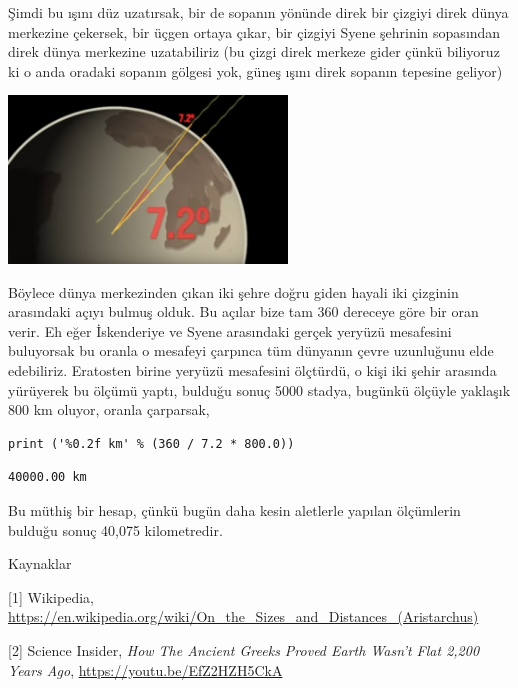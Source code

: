 \documentclass[12pt,fleqn]{article}\usepackage{../../common}
\begin{document}
Şimdi bu ışını düz uzatırsak, bir de sopanın yönünde direk bir çizgiyi direk
dünya merkezine çekersek, bir üçgen ortaya çıkar, bir çizgiyi Syene şehrinin
sopasından direk dünya merkezine uzatabiliriz (bu çizgi direk merkeze gider
çünkü biliyoruz ki o anda oradaki sopanın gölgesi yok, güneş ışını direk sopanın
tepesine geliyor)

\includegraphics[width=20em]{circum2.jpg}

Böylece dünya merkezinden çıkan iki şehre doğru giden hayali iki çizginin
arasındaki açıyı bulmuş olduk. Bu açılar bize tam 360 dereceye göre bir oran
verir. Eh eğer İskenderiye ve Syene arasındaki gerçek yeryüzü mesafesini
buluyorsak bu oranla o mesafeyi çarpınca tüm dünyanın çevre uzunluğunu elde
edebiliriz. Eratosten birine yeryüzü mesafesini ölçtürdü, o kişi iki şehir
arasında yürüyerek bu ölçümü yaptı, bulduğu sonuç 5000 stadya, bugünkü
ölçüyle yaklaşık 800 km oluyor, oranla çarparsak,

\begin{verbatim}
print ('%0.2f km' % (360 / 7.2 * 800.0))
\end{verbatim}

\begin{verbatim}
40000.00 km
\end{verbatim}

Bu müthiş bir hesap, çünkü bugün daha kesin aletlerle yapılan ölçümlerin bulduğu
sonuç 40,075 kilometredir.

Kaynaklar

[1] Wikipedia,
    \url{https://en.wikipedia.org/wiki/On_the_Sizes_and_Distances_(Aristarchus)}

[2] Science Insider, {\em How The Ancient Greeks Proved Earth Wasn't Flat 2,200 Years Ago},
    \url{https://youtu.be/EfZ2HZH5CkA}
    
\end{document}
